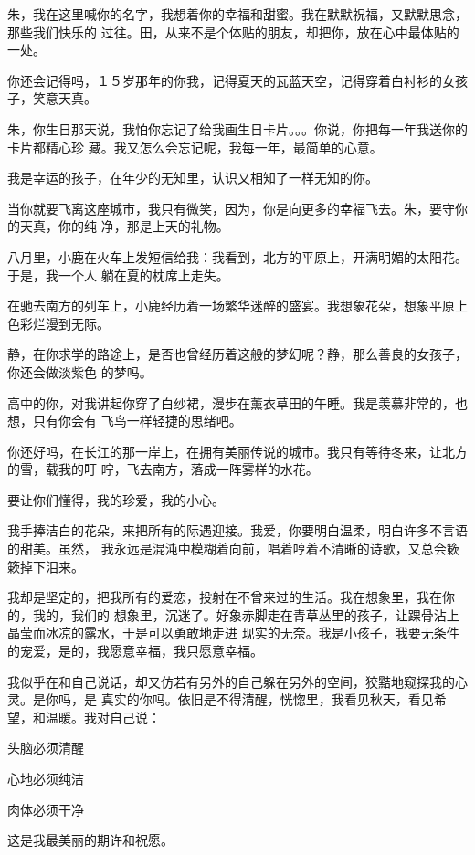 \documentclass[12pt,a4paper]{article}
\def\blankrev{\vspace{1ex}}									%
\begin{document}
		\blankrev
		朱，我在这里喊你的名字，我想着你的幸福和甜蜜。我在默默祝福，又默默思念，那些我们快乐的
	过往。田，从来不是个体贴的朋友，却把你，放在心中最体贴的一处。

		你还会记得吗，１５岁那年的你我，记得夏天的瓦蓝天空，记得穿着白衬衫的女孩子，笑意天真。

		朱，你生日那天说，我怕你忘记了给我画生日卡片。。。你说，你把每一年我送你的卡片都精心珍
	藏。我又怎么会忘记呢，我每一年，最简单的心意。

		我是幸运的孩子，在年少的无知里，认识又相知了一样无知的你。

		当你就要飞离这座城市，我只有微笑，因为，你是向更多的幸福飞去。朱，要守你的天真，你的纯
	净，那是上天的礼物。


		\blankrev
		八月里，小鹿在火车上发短信给我：我看到，北方的平原上，开满明媚的太阳花。于是，我一个人
	躺在夏的枕席上走失。

		在驰去南方的列车上，小鹿经历着一场繁华迷醉的盛宴。我想象花朵，想象平原上色彩烂漫到无际。

		静，在你求学的路途上，是否也曾经历着这般的梦幻呢？静，那么善良的女孩子，你还会做淡紫色
	的梦吗。

		高中的你，对我讲起你穿了白纱裙，漫步在薰衣草田的午睡。我是羡慕非常的，也想，只有你会有
	飞鸟一样轻捷的思绪吧。

		你还好吗，在长江的那一岸上，在拥有美丽传说的城市。我只有等待冬来，让北方的雪，载我的叮
	咛，飞去南方，落成一阵雾样的水花。


		\blankrev
		要让你们懂得，我的珍爱，我的小心。

		我手捧洁白的花朵，来把所有的际遇迎接。我爱，你要明白温柔，明白许多不言语的甜美。虽然，
	我永远是混沌中模糊着向前，唱着哼着不清晰的诗歌，又总会簌簌掉下泪来。

		我却是坚定的，把我所有的爱恋，投射在不曾来过的生活。我在想象里，我在你的，我的，我们的
	想象里，沉迷了。好象赤脚走在青草丛里的孩子，让踝骨沾上晶莹而冰凉的露水，于是可以勇敢地走进
	现实的无奈。我是小孩子，我要无条件的宠爱，是的，我愿意幸福，我只愿意幸福。

		我似乎在和自己说话，却又仿若有另外的自己躲在另外的空间，狡黠地窥探我的心灵。是你吗，是
	真实的你吗。依旧是不得清醒，恍惚里，我看见秋天，看见希望，和温暖。我对自己说：

		\blankrev
		头脑必须清醒 \par
		心地必须纯洁 \par
		肉体必须干净

		这是我最美丽的期许和祝愿。

	\endwriting
\end{document}
